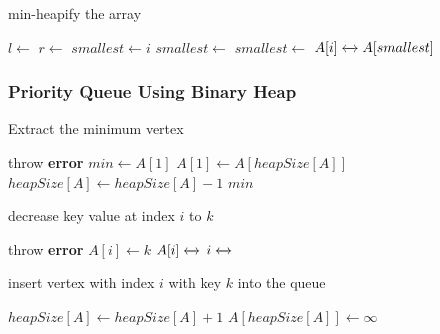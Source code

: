 \documentclass{beamer}
\begin{document}
\begin{frame}
	\begin{algorithm}[H]
		\caption{min-heapify the array}
		\begin{algorithmic}[1]
			\State \(l \gets \) 
			\State \( r \gets \) 
			\State \( smallest \gets i \) 
			\State \( smallest \gets \) 
			\EndIf
			\State \( smallest \gets \) 
			\EndIf
			\State \( A[i] \xleftrightarrow{} A[smallest] \)
			\State {}
			\EndIf
			\EndFunction
		\end{algorithmic}
	\end{algorithm}	
\end{frame}

\begin{frame}
	\frametitle{Priority Queue Using Binary Heap}
	\begin{algorithm}[H]
		\caption{Extract the minimum vertex}
		\begin{algorithmic}[1]
			\State throw \textbf{error}  
			\EndIf
			\State \( min \gets A[1] \) 
			\State \( A[1] \gets A[heapSize[A]]\) 
			\State \( heapSize[A] \gets heapSize[A]-1\) 
			\State {} 
			\State \Return \( min \) 
			\EndFunction
		\end{algorithmic}
	\end{algorithm}
\end{frame}

\begin{frame}
	\begin{algorithm}[H]
		\caption{decrease key value at index $i$ to $k$}
		\begin{algorithmic}[1]
			\State throw \textbf{error}  
			\EndIf
			\State \( A[i] \gets k \) 
			\State \( A[i] \xleftrightarrow{} \) 
			\State \( i \xleftrightarrow{} \) 
			\EndWhile
			\EndFunction
		\end{algorithmic}
	\end{algorithm}
\end{frame}

\begin{frame}
	\begin{algorithm}[H]
		\caption{insert vertex with index \( i \) with key \( k \)  into the queue}
		\begin{algorithmic}[1]
			\State \( heapSize[A] \gets heapSize[A]+1 \) 
			\State \( A[heapSize[A]] \gets \infty\) 
			\State {}
			\EndFunction
		\end{algorithmic}
	\end{algorithm}
\end{frame}
\end{document}

